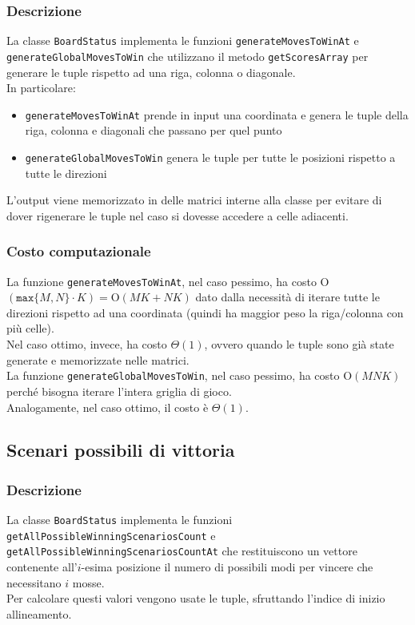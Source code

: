 \documentclass[11pt]{article}
\begin{document}
\subsubsection*{Descrizione}
La classe \texttt{BoardStatus} implementa le funzioni \texttt{generateMovesToWinAt} e \texttt{generateGlobalMovesToWin} che utilizzano il metodo \texttt{getScoresArray} per generare le tuple rispetto ad una riga, colonna o diagonale.\\
In particolare: 
\begin{itemize}
\setlength\itemsep{0.05cm}
	\item \texttt{generateMovesToWinAt} prende in input una coordinata e genera le tuple della riga, colonna e diagonali che passano per quel punto
	\item \texttt{generateGlobalMovesToWin} genera le tuple per tutte le posizioni rispetto a tutte le direzioni
\end{itemize}
L'output viene memorizzato in delle matrici interne alla classe per evitare di dover rigenerare le tuple nel caso si dovesse accedere a celle adiacenti.
\subsubsection*{Costo computazionale}
La funzione \texttt{generateMovesToWinAt}, nel caso pessimo, ha costo O$(\texttt{max}\{M, N\} \cdot K) = \text{O}(MK+NK)$ dato dalla necessità di iterare tutte le direzioni rispetto ad una coordinata (quindi ha maggior peso la riga/colonna con più celle).\\
Nel caso ottimo, invece, ha costo $\Theta(1)$, ovvero quando le tuple sono già state generate e memorizzate nelle matrici.\\
La funzione \texttt{generateGlobalMovesToWin}, nel caso pessimo, ha costo O$(MNK)$ perché bisogna iterare l'intera griglia di gioco.\\
Analogamente, nel caso ottimo, il costo è $\Theta(1)$.

\newpage

\subsection*{Scenari possibili di vittoria}
\subsubsection*{Descrizione}
La classe \texttt{BoardStatus} implementa le funzioni \texttt{getAllPossibleWinningScenariosCount} e \texttt{getAllPossibleWinningScenariosCountAt} che restituiscono un vettore contenente all'$i$-esima posizione il numero di possibili modi per vincere che necessitano $i$ mosse.\\
Per calcolare questi valori vengono usate le tuple, sfruttando l'indice di inizio allineamento.
\end{document}
